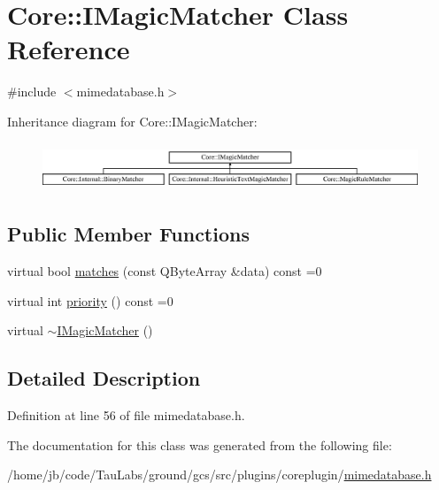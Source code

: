 \hypertarget{class_core_1_1_i_magic_matcher}{\section{\-Core\-:\-:\-I\-Magic\-Matcher \-Class \-Reference}
\label{class_core_1_1_i_magic_matcher}
}


{\ttfamily \#include $<$mimedatabase.\-h$>$}

\-Inheritance diagram for \-Core\-:\-:\-I\-Magic\-Matcher\-:\begin{figure}[H]
\begin{center}
\leavevmode
\includegraphics[height=1.452659cm]{class_core_1_1_i_magic_matcher}
\end{center}
\end{figure}
\subsection*{\-Public \-Member \-Functions}
\begin{DoxyCompactItemize}
\item 
virtual bool \hyperlink{group___core_plugin_ga2571173c2abeb821f275fc5ff669b37a}{matches} (const \-Q\-Byte\-Array \&data) const =0
\item 
virtual int \hyperlink{group___core_plugin_ga01c0bbe130ce9e9ed58f3c359a1b81ff}{priority} () const =0
\item 
virtual \hyperlink{group___core_plugin_ga70c3fb739222b588d80c8e770a4d33b3}{$\sim$\-I\-Magic\-Matcher} ()
\end{DoxyCompactItemize}


\subsection{\-Detailed \-Description}


\-Definition at line 56 of file mimedatabase.\-h.



\-The documentation for this class was generated from the following file\-:\begin{DoxyCompactItemize}
\item 
/home/jb/code/\-Tau\-Labs/ground/gcs/src/plugins/coreplugin/\hyperlink{mimedatabase_8h}{mimedatabase.\-h}\end{DoxyCompactItemize}
